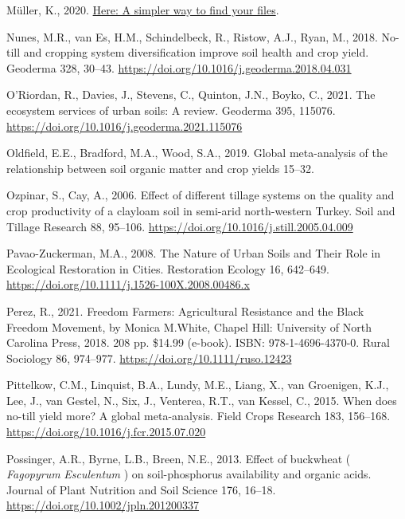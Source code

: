 \documentclass[
  12pt,
]{article}
\newlength{\cslhangindent}
\newlength{\cslentryspacingunit} %
\newenvironment{CSLReferences}[2] %
 {%
  \setlength{\parindent}{0pt}
  \ifodd #1
  \let\oldpar\par
  \def\par{\hangindent=\cslhangindent\oldpar}
  \fi
  \setlength{\parskip}{#2\cslentryspacingunit}
 }%
 {}
\begin{document}
\begin{CSLReferences}{1}{0}
\leavevmode{}%
Müller, K., 2020. \href{https://CRAN.R-project.org/package=here}{Here: A simpler way to find your files}.

\leavevmode{}%
Nunes, M.R., van Es, H.M., Schindelbeck, R., Ristow, A.J., Ryan, M., 2018. No-till and cropping system diversification improve soil health and crop yield. Geoderma 328, 30--43. \url{https://doi.org/10.1016/j.geoderma.2018.04.031}

\leavevmode{}%
O'Riordan, R., Davies, J., Stevens, C., Quinton, J.N., Boyko, C., 2021. The ecosystem services of urban soils: {A} review. Geoderma 395, 115076. \url{https://doi.org/10.1016/j.geoderma.2021.115076}

\leavevmode{}%
Oldfield, E.E., Bradford, M.A., Wood, S.A., 2019. Global meta-analysis of the relationship between soil organic matter and crop yields 15--32.

\leavevmode{}%
Ozpinar, S., Cay, A., 2006. Effect of different tillage systems on the quality and crop productivity of a clay\textendash loam soil in semi-arid north-western {Turkey}. Soil and Tillage Research 88, 95--106. \url{https://doi.org/10.1016/j.still.2005.04.009}

\leavevmode{}%
Pavao-Zuckerman, M.A., 2008. The {Nature} of {Urban Soils} and {Their Role} in {Ecological Restoration} in {Cities}. Restoration Ecology 16, 642--649. \url{https://doi.org/10.1111/j.1526-100X.2008.00486.x}

\leavevmode{}%
Perez, R., 2021. Freedom {Farmers}: {Agricultural Resistance} and the {Black Freedom Movement}, by {Monica M}.{White}, {Chapel Hill}: {University} of {North Carolina Press}, 2018. 208 pp. \$14.99 (e-book). {ISBN}: 978-1-4696-4370-0. Rural Sociology 86, 974--977. \url{https://doi.org/10.1111/ruso.12423}

\leavevmode{}%
Pittelkow, C.M., Linquist, B.A., Lundy, M.E., Liang, X., van Groenigen, K.J., Lee, J., van Gestel, N., Six, J., Venterea, R.T., van Kessel, C., 2015. When does no-till yield more? {A} global meta-analysis. Field Crops Research 183, 156--168. \url{https://doi.org/10.1016/j.fcr.2015.07.020}

\leavevmode{}%
Possinger, A.R., Byrne, L.B., Breen, N.E., 2013. Effect of buckwheat ( {\emph{Fagopyrum}}{ \emph{Esculentum}} ) on soil-phosphorus availability and organic acids. Journal of Plant Nutrition and Soil Science 176, 16--18. \url{https://doi.org/10.1002/jpln.201200337}


\end{CSLReferences}
\end{document}
